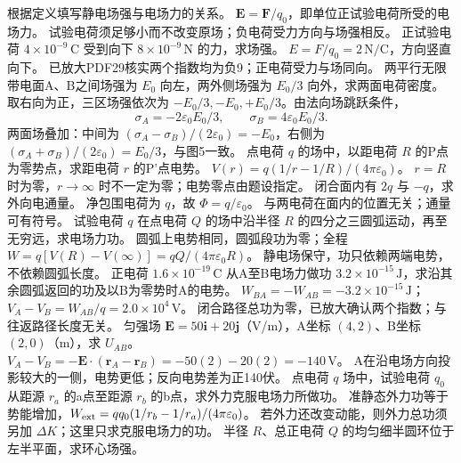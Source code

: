 \problemtext 根据定义填写静电场强与电场力的关系。
\workings $\bm E=\bm F/q_0$，即单位正试验电荷所受的电场力。
\crosscheck 试验电荷须足够小而不改变原场；负电荷受力方向与场强相反。
\problemtext 正试验电荷 $4\times10^{-9}\,\mathrm C$ 受到向下 $8\times10^{-9}\,\mathrm N$ 的力，求场强。
\workings $E=F/q_0=2\,\mathrm{N/C}$，方向竖直向下。
\crosscheck 已放大PDF29核实两个指数均为负9；正电荷受力与场同向。
\problemtext 两平行无限带电面A、B之间场强为 $E_0$ 向左，两外侧场强为 $E_0/3$ 向外，求两面电荷密度。
\workings 取右向为正，三区场强依次为 $-E_0/3,-E_0,+E_0/3$。由法向场跳跃条件，
\[
\sigma_A=-2\varepsilon_0E_0/3,\qquad
\sigma_B=4\varepsilon_0E_0/3.
\]
\crosscheck 两面场叠加：中间为 $(\sigma_A-\sigma_B)/(2\varepsilon_0)=-E_0$，右侧为 $(\sigma_A+\sigma_B)/(2\varepsilon_0)=E_0/3$，与图5一致。
\problemtext 点电荷 $q$ 的场中，以距电荷 $R$ 的P点为零势点，求距电荷 $r$ 的P'点电势。
\workings $V(r)=q(1/r-1/R)/(4\pi\varepsilon_0)$。
\crosscheck $r=R$ 时为零，$r\to\infty$ 时不一定为零；电势零点由题设指定。
\problemtext 闭合面内有 $2q$ 与 $-q$，求外向电通量。
\workings 净包围电荷为 $q$，故 $\Phi=q/\varepsilon_0$。
\crosscheck 与两电荷在面内的位置无关；通量可有符号。
\problemtext 试验电荷 $q$ 在点电荷 $Q$ 的场中沿半径 $R$ 的四分之三圆弧运动，再至无穷远，求电场力功。
\workings 圆弧上电势相同，圆弧段功为零；全程 $W=q[V(R)-V(\infty)]=qQ/(4\pi\varepsilon_0R)$。
\crosscheck 静电场保守，功只依赖两端电势，不依赖圆弧长度。
\problemtext 正电荷 $1.6\times10^{-19}\,\mathrm C$ 从A至B电场力做功 $3.2\times10^{-15}\,\mathrm J$，求沿其余圆弧返回的功及以B为零势时A的电势。
\workings $W_{BA}=-W_{AB}=-3.2\times10^{-15}\,\mathrm J$；$V_A-V_B=W_{AB}/q=2.0\times10^4\,\mathrm V$。
\crosscheck 闭合路径总功为零，已放大确认两个指数；与往返路径长度无关。
\problemtext 匀强场 $\bm E=50\bm i+20\bm j$（V/m），A坐标 $(4,2)$、B坐标 $(2,0)$（m），求 $U_{AB}$。
\workings $V_A-V_B=-\bm E\cdot(\bm r_A-\bm r_B)=-50(2)-20(2)=-140\,\mathrm V$。
\crosscheck A在沿电场方向投影较大的一侧，电势更低；反向电势差为正140伏。
\problemtext 点电荷 $q$ 场中，试验电荷 $q_0$ 从距源 $r_a$ 的a点至距源 $r_b$ 的b点，求外力克服电场力所做功。
\workings 准静态外力功等于势能增加，$W_{\rm ext}=qq_0(1/r_b-1/r_a)/(4\pi\varepsilon_0)$。
\crosscheck 若外力还改变动能，则外力总功须另加 $\Delta K$；这里只求克服电场力的功。
\problemtext 半径 $R$、总正电荷 $Q$ 的均匀细半圆环位于左半平面，求环心场强。
